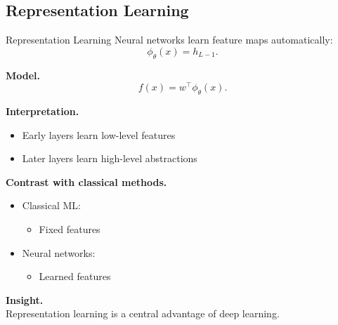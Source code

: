\documentclass[aspectratio=169,11pt]{beamer}
\begin{document}
\subsection{Representation Learning}
\begin{frame}[t,allowframebreaks]{Representation Learning}
\small
Neural networks learn feature maps automatically:
\[
\phi_\theta(x) = h_{L-1}.
\]

\textbf{Model.}\\ \[
f(x) = w^\top \phi_\theta(x).
\]

\textbf{Interpretation.}\\ \begin{itemize}
    \item Early layers learn low-level features
    \item Later layers learn high-level abstractions
\end{itemize}

\textbf{Contrast with classical methods.}\\ \begin{itemize}
    \item Classical ML:
    \begin{itemize}
        \item Fixed features
    \end{itemize}
    \item Neural networks:
    \begin{itemize}
        \item Learned features
    \end{itemize}
\end{itemize}

\textbf{Insight.}\\ Representation learning is a central advantage of deep learning.
\end{frame}
\end{document}
